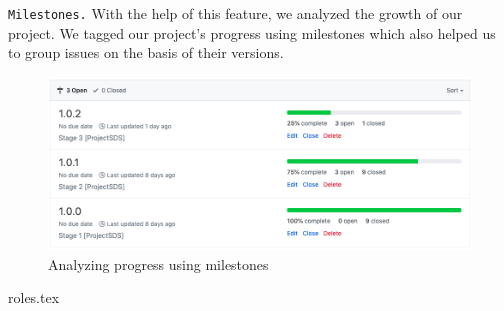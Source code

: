 \texttt{Milestones.} With the help of this feature, we analyzed the growth of our project. We tagged our project's progress using milestones which also helped us to group issues on the basis of their versions.

\begin{figure}[H]
    \centering
    \includegraphics[width=12cm,keepaspectratio=true]{images/git/git_milestones.png}
    \caption{Analyzing progress using milestones}
\end{figure}

{roles.tex}

